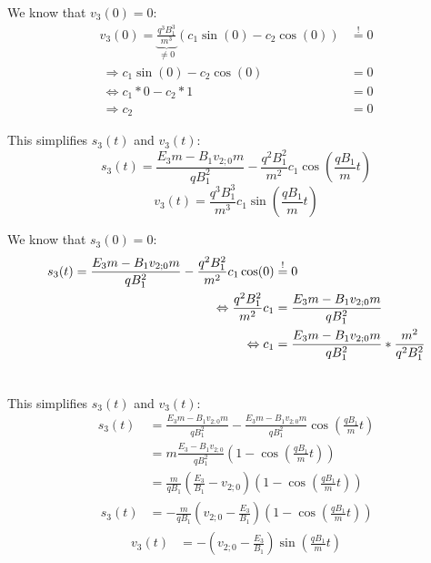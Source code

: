 \documentclass[a4paper, 10pt]{article}
\begin{document}
We know that $v_3(0) = 0$:
\begin{equation}
\begin{split}
v_3(0) = \underbrace{\frac{q^3 B_1^3}{m^3}}_{\neq 0} (c_1 \sin(0) - c_2 \cos(0)) &\overset{\text{!}}{=} 0  \\\
\Rightarrow c_1 \sin(0) - c_2 \cos(0) &= 0 \\\
\Leftrightarrow c_1 * 0 - c_2 * 1 &= 0 \\\
\Rightarrow c_2 &= 0
\end{split}
\end{equation}

This simplifies $s_3(t)$ and $v_3(t)$:
\begin{equation}
s_3(t) = \frac{E_3 m - B_1 v_{2;0} m}{q B_1^2} - \frac{q^2 B_1^2}{m^2} c_1 \cos\left(\frac{q B_1}{m} t\right)
\end{equation}
%
\begin{equation}
v_3(t) = \frac{q^3 B_1^3}{m^3} c_1 \sin\left(\frac{q B_1}{m} t\right)
\end{equation}

We know that $s_3(0) = 0$:
\begin{equation}
\begin{split}
s_3(t) = \frac{E_3 m - B_1 v_{2;0} m}{q B_1^2} - \frac{q^2 B_1^2}{m^2} c_1 \cos(0) &\overset{\text{!}}{=} 0 \\\
\Leftrightarrow \hfill \frac{q^2 B_1^2}{m^2} c_1 &= \frac{E_3 m - B_1 v_{2;0} m}{q B_1^2} \\\
\Leftrightarrow \hfill c_1 &= \frac{E_3 m - B_1 v_{2;0} m}{q B_1^2} * \frac{m^2}{q^2 B_1^2} \\\
\end{split}
\end{equation}

This simplifies $s_3(t)$ and $v_3(t)$:
\begin{equation}
\begin{split}
s_3(t) 	&= \frac{E_3 m - B_1 v_{2;0} m}{q B_1^2} - \frac{E_3 m - B_1 v_{2;0} m}{q B_1^2} \cos\left(\frac{q B_1}{m} t\right)  \\\
		&= m \frac{E_3 - B_1 v_{2;0}}{q B_1^2} \left( 1 - \cos\left(\frac{q B_1}{m} t\right)\right) \\\
%
		&= 	\frac{m}{q B_1}	\left( \frac{E_3}{B_1} - v_{2;0} \right) \left( 1 - \cos\left(\frac{q B_1}{m} t\right)\right) \\\
%
s_3(t)  &= -\frac{m}{q B_1}	\left( v_{2;0} -\frac{E_3}{B_1} \right) \left( 1 - \cos\left(\frac{q B_1}{m} t\right)\right)
\end{split}
\end{equation}
%
\begin{equation}
\begin{split}
v_3(t) &= -\left(v_{2;0} - \frac{E_3}{B_1}\right) \sin\left(\frac{q B_1}{m} t\right)
\end{split}
\end{equation}
\end{document}
